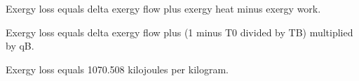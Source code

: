 Exergy loss equals delta exergy flow plus exergy heat minus exergy work.  

Exergy loss equals delta exergy flow plus (1 minus T0 divided by TB) multiplied by qB.  

Exergy loss equals 1070.508 kilojoules per kilogram.